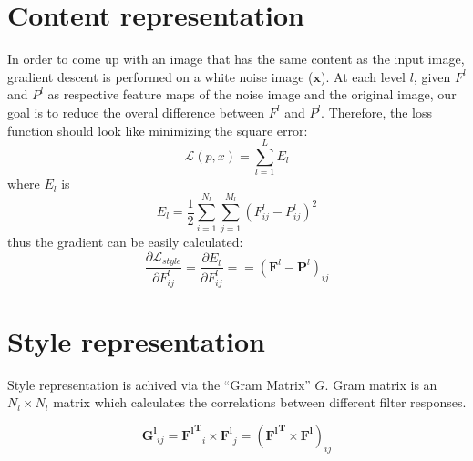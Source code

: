 \documentclass{article}
\begin{document}
\section*{Content representation}
In order to come up with an image that has the same content as the input
image, gradient descent is performed on a white noise image ($\mathbf{x}$).
At each level $l$, given $F^l$ and $P^l$ as respective feature maps of the
noise image and the original image, our goal is to reduce the overal difference
between $F^l$ and $P^l$. Therefore, the loss function should look like
minimizing the square error:
\begin{equation}
    \mathcal{L}(p, x) = \sum_{l=1}^{L} {E_l}
\end{equation}
where $E_l$ is
\begin{equation}
    {E_l} = \frac{1}{2} \sum_{i=1}^{N_l}\sum_{j=1}^{M_l}{(F^l_{ij} - P^l_{ij})^2}
\end{equation}
thus the gradient can be easily calculated:
\begin{equation}
    \frac{\partial \mathcal{L}_{style}}{\partial F^l_{ij}} = \frac{\partial E_l}{\partial F^l_{ij}} =
    = (\mathbf{F}^l - \mathbf{P}^l)_{ij}
\end{equation}
\section*{Style representation}
Style representation is achived via the ``Gram Matrix'' $G$. Gram matrix is
an $N_l \times N_l$ matrix which calculates the correlations between
different filter responses.

\begin{equation}
    \mathbf{G^l}_{ij} = \mathbf{{F^l}^T}_i \times \mathbf{F^l}_j
    = (\mathbf{{F^l}^T} \times \mathbf{F^l})_{ij}
\end{equation}
\end{document}

